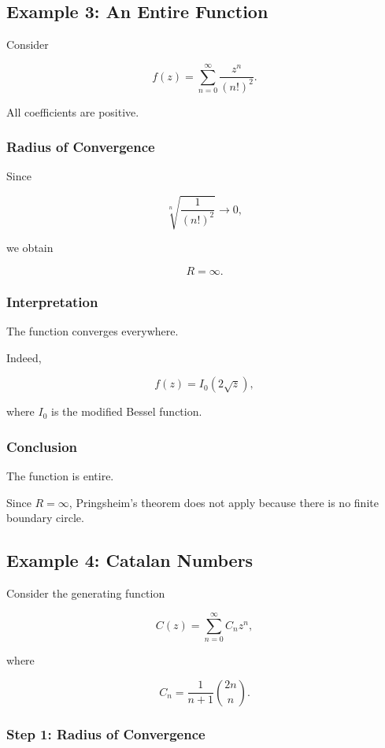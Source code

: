 \documentclass[12pt,a4paper]{article}
\theoremstyle{notespace}
\begin{document}
\bigskip

\subsection{Example 3: An Entire Function}

Consider

\[
f(z)=
\sum_{n=0}^{\infty}
\frac{z^n}{(n!)^2}.
\]

All coefficients are positive.

\subsubsection*{Radius of Convergence}

Since

\[
\sqrt[n]{\frac1{(n!)^2}}
\longrightarrow 0,
\]

we obtain

\[
R=\infty.
\]

\subsubsection*{Interpretation}

The function converges everywhere.

Indeed,

\[
f(z)=I_0(2\sqrt z),
\]

where \(I_0\) is the modified Bessel function.

\subsubsection*{Conclusion}

The function is entire.

Since \(R=\infty\), Pringsheim's theorem does not apply because there is no finite boundary circle.

\bigskip

\subsection{Example 4: Catalan Numbers}

Consider the generating function

\[
C(z)=
\sum_{n=0}^{\infty}
C_n z^n,
\]

where

\[
C_n=
\frac1{n+1}
\binom{2n}{n}.
\]

\subsubsection*{Step 1: Radius of Convergence}
\end{document}
